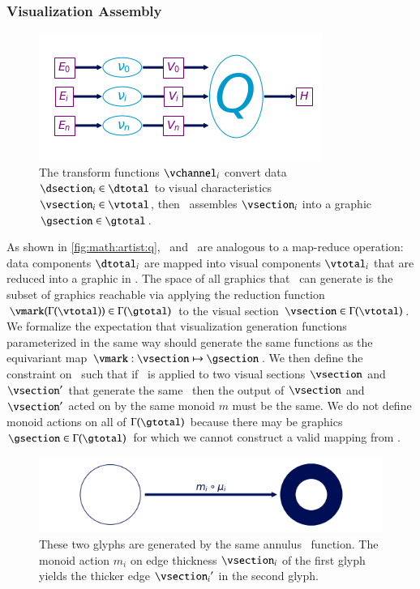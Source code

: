 \documentclass[journal]{vgtc}                %
\begin{document}
\subsubsection{Visualization Assembly}
\label{sec:math:artist:q}
\begin{figure}[htb]
  \centering
  \includegraphics[width=\columnwidth]{path_of_q}
  \caption{The transform functions $\vchannel_i$ convert data $\dsection_i\in \dtotal$ to visual characteristics $\vsection_i \in \vtotal$, then \vmark\ assembles $\vsection_i$ into a graphic $\gsection \in \gtotal$.} 
  \label{fig:math:artist:q}
\end{figure}
As shown in \autoref{fig:math:artist:q}, \vchannel\ and \vmark\ are analogous to a  map-reduce operation: data components $\dtotal_{i}$ are mapped into visual components $\vtotal_{i}$ that are reduced into a graphic in \gtotal. The space of all graphics that \vmark\ can generate is the subset of graphics reachable via applying the reduction function $\vmark(\Gamma(\vtotal)) \in \Gamma(\gtotal)$ to the visual section $\vsection \in \Gamma(\vtotal)$. We formalize the expectation that visualization generation functions parameterized in the same way should generate the same functions as the equivariant map $\vmark: \vsection \mapsto \gsection$. We then define the constraint on \vmark\ such that if \vmark\ is applied to two visual sections $\vsection$ and $\vsection^{\prime}$ that generate the same \gsection\, then the output of $\vsection$ and $\vsection^{\prime}$ acted on by the same monoid $m$ must be the same.  We do not define monoid actions on all of $\Gamma(\gtotal)$ because there may be graphics $\gsection \in \Gamma(\gtotal)$ for which we cannot construct a valid mapping from \vtotal.
\begin{figure}[htb]
  \centering
  \includegraphics[width=\columnwidth]{diff_type_q.png}
  \caption{These two glyphs are generated by the same annulus \vmark\ function. The monoid action $m_i$ on edge thickness $\vsection_i$ of the first glyph yields the thicker edge ${\vsection_i}^{\prime}$ in the second glyph.}
  \label{fig:math:artist:graphic}
\end{figure}
\end{document}
